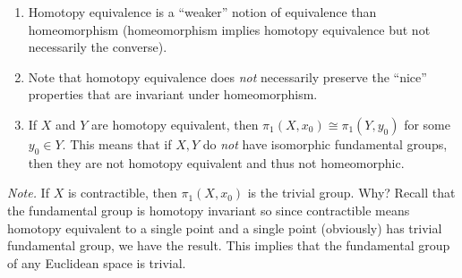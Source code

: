 \documentclass{article}
\theoremstyle{definition}
\begin{document}
\begin{flushleft}
\begin{enumerate}
    \item Homotopy equivalence is a ``weaker'' notion of equivalence than homeomorphism (homeomorphism implies homotopy equivalence but not necessarily the converse).
    \item Note that homotopy equivalence does \textit{not} necessarily preserve the ``nice'' properties that are invariant under homeomorphism.
    \item If $X$ and $Y$ are homotopy equivalent, then $\pi_1(X, x_0) \cong \pi_1(Y, y_0)$ for some $y_0 \in Y$. This means that if $X, Y$ do \textit{not} have isomorphic fundamental groups, then they are not homotopy equivalent and thus not homeomorphic.
\end{enumerate}

\textit{Note.} If $X$ is contractible, then $\pi_1(X, x_0)$ is the trivial group. Why? Recall that the fundamental group is homotopy invariant so since contractible means homotopy equivalent to a single point and a single point (obviously) has trivial fundamental group, we have the result. This implies that the fundamental group of any Euclidean space is trivial.



\end{flushleft}
\end{document}
